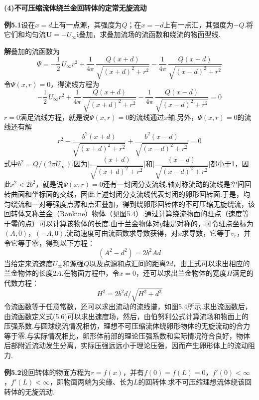 \textbf{(4)不可压缩流体绕兰金回转体的定常无旋流动}

\noindent\textbf{例5.1}\quad 设在$x=d$上有一点源，其强度为$Q$；在$x=-d$上有一点汇，其强度为$-Q$.将它们和均匀流$\boldsymbol{U}=-U_\infty\boldsymbol{i}$叠加，求叠加流场的流函数和绕流的物面型线.

\noindent\textbf{解}\quad 叠加的流函数为
\[
\Psi=-\frac{1}{2}\,U_\infty r^{2}+\frac{1}{4\pi}\,\frac{Q(x+d)}{\sqrt{(x+d)^{2}+r^{2}}}-\frac{1}{4\pi}\,\frac{Q(x-d)}{\sqrt{(x-d)^{2}+r^{2}}}
\]
令$\Psi(x,r)=0$，得流线方程为
\[
-\frac{1}{2}\,U_\infty r^{2}+\frac{1}{4\pi}\,\frac{Q(x+d)}{\sqrt{(x+d)^{2}+r^{2}}}-\frac{1}{4\pi}\,\frac{Q(x-d)}{\sqrt{(x-d)^{2}+r^{2}}}=0
\]
$r=0$满足流线方程，就是说$\Psi(x,r)=0$的流线通过$x$轴.另外，$\Psi(x,r)=0$的流线还有解
\[
r^{2}-\frac{b^{2}(x+d)}{\sqrt{(x+d)^{2}+r^{2}}}+\frac{b^{2}(x-d)}{\sqrt{(x-d)^{2}+r^{2}}}=0
\]
式中$b^{2}=Q/(2\pi U_\infty)$.因为$\Big|\dfrac{(x+d)}{\sqrt{(x+d)^{2}+r^{2}}}\Big|$和$\Big|\dfrac{(x-d)}{\sqrt{(x-d)^{2}+r^{2}}}\Big|$都小于1，因此$r^{2}<2b^{2}$，就是说$\Psi(x,r)=0$还有一封闭分支流线.轴对称流动的流线是空间回转曲面和坐标面的交线，因此上述封闭分支流线代表封闭的卵形回转面.于是，均匀绕流和一对等强度点源和点汇叠加，得到绕卵形回转体的不可压缩无旋绕流，该回转体又称兰金（Rankine）物体（见图5.4）.通过计算绕流物面的驻点（速度等于零的点）可以计算该物体的长度.由于兰金物体对$y$轴是对称的，可令驻点坐标为$(A,0)$，$(-A,0)$.流动速度可由流函数求导数获得，对$x$求导数，它等于$v_r$，并令它等于零，得到以下方程：
\[
(A^{2}-d^{2})=2b^{2}Ad
\]
当给定来流速度$U_\infty$和源强$Q$以及点源和点汇间的距离$2d$，由上式可以求出相应的兰金物体的长度$2A$.在物面方程中，令$x=0$，还可以求出兰金物体的宽度$H$满足的代数方程：
\[
H^{2}=2b^{2}d\big/\sqrt{H^{2}+d^{2}}
\]
令流函数等于任意常数，还可以求出流动的流线谱，如图5.4所示.求出流函数后，由流函数定义式(5.6)可以求出速度场，然后，由伯努利公式计算流场和物面上的压强系数.与圆球绕流情况相仿，理想不可压缩流体绕卵形物体的无旋流动的合力等于零.与实际情况相比，卵形体前部的理论压强系数和实际情况符合良好，物体后部附近流动发生分离，实际压强远远小于理论压强，因而产生卵形体上的流动阻力.

\noindent\textbf{例5.2}\quad 设回转体的物面方程为$r=f(x)$，并有$f(0)=f(L)=0$，$f'(0)<\infty$，$f'(L)<\infty$，即物面两端为尖缘、长为$L$的回转体.求不可压缩理想流体绕该回转体的无旋流动.

